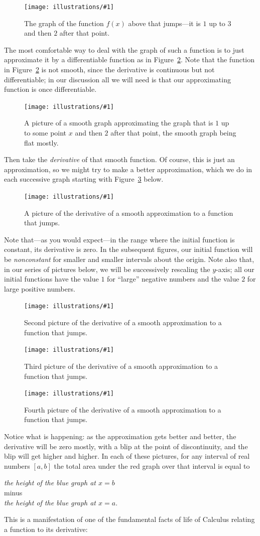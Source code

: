 \documentclass[openany]{book}
\newcommand{\ill}[3]{%
   \begin{figure}[H]%
   \vspace{-2ex}
   \centering%
   \texttt{[image: illustrations/\#1]}%
   \caption{#3}%
   \vspace{-2ex}
    \end{figure}}
\theoremstyle{plain}
\theoremstyle{definition}
\begin{document}
{{\ill{jump}{0.5}{The graph of the function $f(x)$ above that jumps---it is $1$ up to $3$ and then $2$ after that point.\label{fig:jump}}


The most comfortable way to deal with the graph of such a function is
to just approximate it by a differentiable function as in
Figure~\ref{fig:jumpsmooth}.  Note that the function in
Figure~\ref{fig:jumpsmooth} is not smooth, since the
derivative is continuous but not differentiable; in our
discussion all
we will need is that our approximating function is once
differentiable.


\ill{jump-smooth}{0.5}{A picture of a smooth graph approximating the
  graph that is $1$ up to some point $x$ and then $2$ after that
  point, the smooth graph being flat mostly.\label{fig:jumpsmooth}}


Then take the {\em derivative} of that smooth function.  Of course,
this is just an approximation, so we might try to make a better
approximation, which we do in each successive graph starting
with Figure~\ref{fig:djump1} below.


\ill{jump-smooth-deriv-7}{0.6}{A picture of the derivative of
a smooth approximation to a function that jumps.\label{fig:djump1}}

Note that---as you would expect---in the range where the initial
function is constant, its derivative is zero. In the subsequent
figures, our initial function will be {\it nonconstant} for smaller
and smaller intervals about the origin. Note also that, in our series
of pictures below, we will be successively rescaling the $y$-axis; all
our initial functions have the value $1$ for ``large'' negative numbers
and the value $2$ for large positive numbers.

\ill{jump-smooth-deriv-2}{0.5}{Second picture of the derivative of
a smooth approximation to a function that jumps.\label{fig:djump2}}
\ill{jump-smooth-deriv-05}{0.5}{Third picture of the derivative of
a smooth approximation to a function that jumps.\label{fig:djump3}}
\ill{jump-smooth-deriv-01}{0.5}{Fourth picture of the derivative of
a smooth approximation to a function that jumps.\label{fig:djump4}}


Notice what is happening: as the approximation gets better and
better, the derivative will be zero mostly, with a blip at the point
of discontinuity, and the blip will get higher and higher.
In each of these pictures,  for any interval of real numbers $[a,b]$ the total area under the red graph over that interval is equal to
\begin{center}
{\it the height of the blue graph at $x=b$}\\
minus\\
{\it  the height of the blue graph  at $x=a$}.
\end{center}
This is a manifestation of one of the fundamental facts of life of
Calculus relating a function to its derivative:

}}
\end{document}
